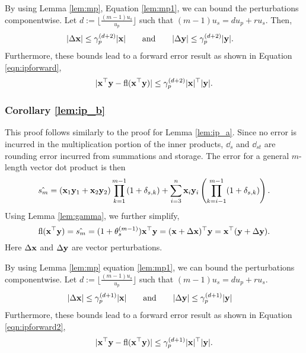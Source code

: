 By using Lemma \ref{lem:mp}, Equation \ref{lem:mp1}, we can bound the perturbations componentwise.
Let $d:=\lfloor\frac{(m-1)u_s}{u_p}\rfloor$ such that $(m-1)u_s = d u_p + r u_s$. Then,
\begin{align*}
|\Delta \bb{x}| &\leq \gamma_p^{(d+2)}|\bb{x}| %
\qquad \mbox{and} \qquad
|\Delta \bb{y}| %
\leq \gamma_p^{(d+2)}|\bb{y}|.
\end{align*}
Furthermore, these bounds lead to a forward error result as shown in Equation \ref{eqn:ipforward},
\begin{equation}
\label{eqn:ipforward}
|\bb{x}^{\top}\bb{y}-\fl(\bb{x}^{\top}\bb{y})| \leq \gamma_p^{(d+2)}|\bb{x}|^{\top}|\bb{y}|.
\end{equation}
%
%

\subsubsection{Corollary \ref{lem:ip_b}}
This proof follows similarly to the proof for Lemma \ref{lem:ip_a}.
Since no error is incurred in the multiplication portion of the inner products, $\dd_s$ and $\dd_{st}$ are rounding error incurred from summations and storage.
The error for a general $m$-length vector dot product is then
\begin{equation}
\label{eqn:dperr_2}
\hat{s_m} = (\bb{x}_1\bb{y}_1+\bb{x}_2\bb{y}_2)\prod_{k=1}^{m-1}(1+\dd_{s,k}) + \sum_{i=3}^n \bb{x}_i\bb{y}_i\left(\prod_{k=i-1}^{m-1}(1+\dd_{s,k})\right).
\end{equation}
Using Lemma \ref{lem:gamma}, we further simplify, 
\begin{equation*}
\mathrm{fl}(\mathbf{x}^{\top}\mathbf{y}) = \hat{s_m} = (1+\theta_s^{(m-1)})\mathbf{x}^{\top}\mathbf{y}= (\mathbf{x}+\Delta\mathbf{x})^{\top}\mathbf{y} = \mathbf{x}^{\top}(\mathbf{y}+\Delta\mathbf{y}).
\end{equation*}
Here $\Delta\mathbf{x}$ and $\Delta\mathbf{y}$ are vector perturbations.

By using Lemma \ref{lem:mp} equation \ref{lem:mp1}, we can bound the perturbations componentwise.
Let $d:=\lfloor\frac{(m-1)u_s}{u_p}\rfloor$ such that $(m-1)u_s = d u_p + r u_s$. 
\begin{align*}
|\Delta \bb{x}| &\leq \gamma_p^{(d+1)}|\bb{x}| %
\qquad \mbox{and} \qquad
|\Delta \bb{y}| %
\leq \gamma_p^{(d+1)}|\bb{y}| 
\end{align*}
Furthermore, these bounds lead to a forward error result as shown in Equation \ref{eqn:ipforward2},
\begin{equation}
\label{eqn:ipforward2}
|\bb{x}^{\top}\bb{y}-\fl(\bb{x}^{\top}\bb{y})| \leq \gamma_p^{(d+1)}|\bb{x}|^{\top}|\bb{y}|.
\end{equation}

